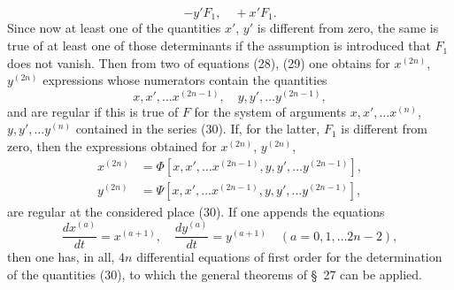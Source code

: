 \documentclass[11pt,a4paper,leqno]{article}
\begin{document}
\[
-y'F_1,
\quad
+x'F_1.
\]
Since now at least one of the quantities $x'$, $y'$ is different from zero, the same is true of at least one of those determinants if the assumption is introduced that $F_1$ does not vanish. Then from two of equations (28), (29) one obtains for $x^{(2n)}$, $y^{(2n)}$ expressions whose numerators contain the quantities
\begin{equation}\tag{30}
x,x',\ldots x^{(2n-1)},\quad y,y',\ldots y^{(2n-1)},
\end{equation}
and are regular if this is true of $F$ for the system of arguments $x,x',\ldots x^{(n)}$, $y,y',\ldots y^{(n)}$ contained in the series (30). If, for the latter, $F_1$ is different from zero, then the expressions obtained for $x^{(2n)}$, $y^{(2n)}$,
\begin{equation}\tag{31}
\begin{aligned}
x^{(2n)}&=\Phi[x,x',\ldots x^{(2n-1)},y,y',\ldots y^{(2n-1)}],\\
y^{(2n)}&=\Psi[x,x',\ldots x^{(2n-1)},y,y',\ldots y^{(2n-1)}],
\end{aligned}
\end{equation}
are regular at the considered place (30). If one appends the equations
\begin{equation}\tag{32}
\frac{dx^{(a)}}{dt}=x^{(a+1)},\quad
\frac{dy^{(a)}}{dt}=y^{(a+1)}\quad (a=0,1,\ldots 2n-2),
\end{equation}
then one has, in all, $4n$ differential equations of first order for the determination of the quantities (30), to which the general theorems of \S~27 can be applied.
\end{document}
